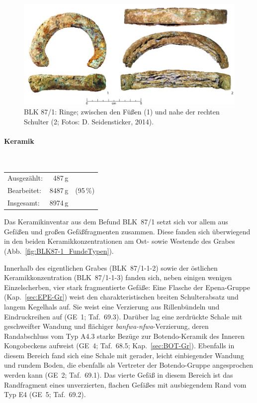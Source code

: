 \begin{figure}[tb]
	\centering
	\includegraphics[width=\textwidth]{fig/BLK87-1_Metall.jpg}
	\caption{BLK 87/1: Ringe; zwischen den Füßen (1) und nahe der rechten Schulter (2; Fotos: D. Seidensticker, 2014).}
	\label{fig:BLK87-1_Metall}
\end{figure}

\paragraph{Keramik\vspace{.5em}}\mbox{}\\
\begin{tabular}{@{}lrl@{}}
Ausgezählt: & 487\,g & \\ 
Bearbeitet: & 8487\,g & (95\,\%) \\ 
Insgesamt: & 8974\,g & \\ 
\end{tabular} 

\vspace{1em}
\noindent Das Keramikinventar aus dem Befund BLK~87/1 setzt sich vor allem aus Gefäßen und großen Gefäßfragmenten zusammen. Diese fanden sich überwiegend in den beiden Keramikkonzentrationen am Ost- sowie Westende des Grabes (Abb.~\ref{fig:BLK87-1_FundeTypen}).

Innerhalb des eigentlichen Grabes (BLK~87/1-1-2) sowie der östlichen Keramikkonzentration (BLK~87/1-1-3) fanden sich, neben einigen wenigen Einzelscherben, vier stark fragmentierte Gefäße: Eine Flasche der Epena-Gruppe (Kap.~\ref{sec:EPE-Gr}) weist den charakteristischen breiten Schulterabsatz und langem Kegelhals auf. Sie weist eine Verzierung aus Rillenbündeln und Eindruckreihen auf (GE~1; Taf.~69.3). Darüber lag eine zerdrückte Schale mit geschweifter Wandung und flächiger \textit{banfwa-nfwa}-Verzierung, deren Randabschluss vom Typ A4.3 starke Bezüge zur Botendo-Keramik des Inneren Kongobeckens aufweist (GE~4; Taf.~68.5; Kap.~\ref{sec:BOT-Gr}). Ebenfalls in diesem Bereich fand sich eine Schale mit gerader, leicht einbiegender Wandung und rundem Boden, die ebenfalls als Vertreter der Botendo-Gruppe angesprochen werden kann (GE~2; Taf.~69.1). Das vierte Gefäß in diesem Bereich ist das Randfragment eines unverzierten, flachen Gefäßes mit ausbiegendem Rand vom Typ E4 (GE~5; Taf.~69.2).

